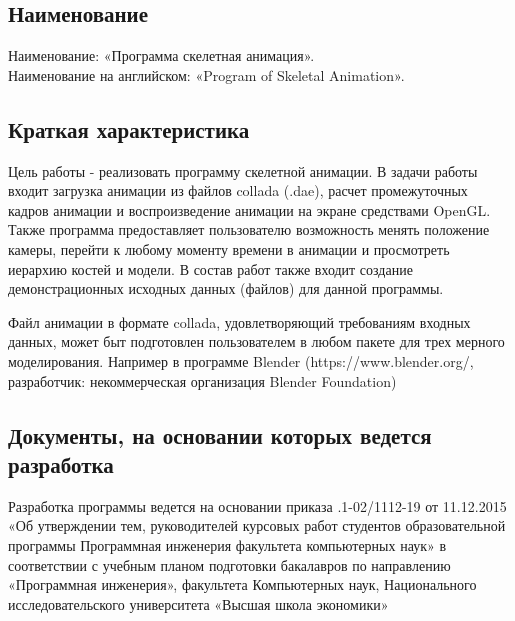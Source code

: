 \subsection{Наименование}
Наименование: «Программа скелетная анимация». \\
Наименование на английском: «Program of Skeletal Animation». \\


\subsection{Краткая характеристика}
    Цель работы - реализовать программу скелетной анимации.
    В задачи работы входит загрузка анимации из файлов collada (.dae), расчет промежуточных кадров анимации и воспроизведение анимации на экране средствами OpenGL.
    Также программа предоставляет пользователю возможность менять положение камеры, перейти к любому моменту времени в анимации и просмотреть иерархию костей и модели.
В состав работ также входит создание демонстрационных исходных данных (файлов) для данной программы.

\smallskip
Файл анимации в формате collada, удовлетворяющий требованиям входных данных, может быт подготовлен пользователем в любом пакете для трех мерного моделирования. Например в программе Blender (https://www.blender.org/, разработчик: некоммерческая организация Blender Foundation)


\subsection{Документы, на основании которых ведется разработка}
Разработка программы ведется на основании приказа 
.1-02/1112-19 от 11.12.2015 
«Об  утверждении  тем,  руководителей  курсовых  работ  студентов
образовательной  программы  Программная  инженерия 
факультета 
компьютерных наук» в соответствии с учебным планом подготовки бакалавров по направлению «Программная инженерия», факультета Компьютерных наук,
Национального исследовательского университета «Высшая школа экономики» 